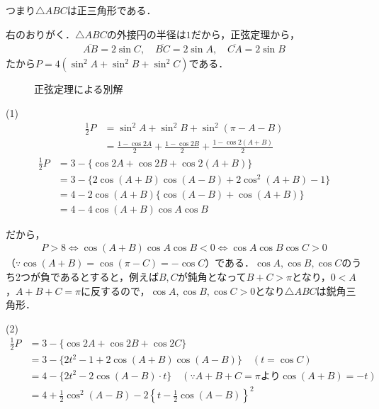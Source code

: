 \documentclass[../main.tex]{subfiles}
\begin{document}
つまり$\triangle ABC$は正三角形である．

\bigskip
\noindent{\bf [解2]}
右のおりがく．$\triangle ABC$の外接円の半径は$1$だから，正弦定理から，
\begin{align*}
  \overline{AB}=2\sin C,\quad\overline{BC}=2\sin A,\quad\overline{CA}=2\sin B
\end{align*}
たから$P=4(\sin^2A+\sin^2B+\sin^2C)$である．

\begin{figure}[htb]
  \centering
  \caption{正弦定理による別解}
\end{figure}

(1)
\begin{align*}
  \frac12P&=\sin^2A+\sin^2B+\sin^2(\pi-A-B)\\
  &=\frac{1-\cos2A}2+\frac{1-\cos2B}2+\frac{1-\cos2(A+B)}2
\end{align*}
\begin{align*}
  \frac12P&=3-\{\cos2A+\cos2B+\cos2(A+B)\}\\
  &=3-\{2\cos(A+B)\cos(A-B)+2\cos^2(A+B)-1\}\\
  &=4-2\cos(A+B)\{\cos(A-B)+\cos(A+B)\}\\
  &=4-4\cos(A+B)\cos A\cos B
\end{align*}

だから，
\begin{align*}
  P>8\iff\cos(A+B)\cos A\cos B<0\iff\cos A\cos B\cos C>0
\end{align*}
（$\because\cos(A+B)=\cos(\pi-C)=-\cos C$）である．$\cos A,\cos B,\cos C$のうち2つが負であるとすると，例えば$B,C$が鈍角となって$B+C>\pi$となり，$0<A$，$A+B+C=\pi$に反するので，$\cos A,\cos B,\cos C>0$となり$\triangle ABC$は鋭角三角形．

(2)
\begin{align*}
  \frac12P&=3-\{\cos2A+\cos2B+\cos2C\}\\
  &=3-\{2t^2-1+2\cos(A+B)\cos(A-B)\}\quad(t=\cos C)\\
  &=4-\{2t^2-2\cos(A-B)\cdot t\}\quad(\because A+B+C=\pi\text{より}\cos(A+B)=-t)\\
  &=4+\frac12\cos^2(A-B)-2\left\{t-\frac12\cos(A-B)\right\}^2
\end{align*}
\end{document}
